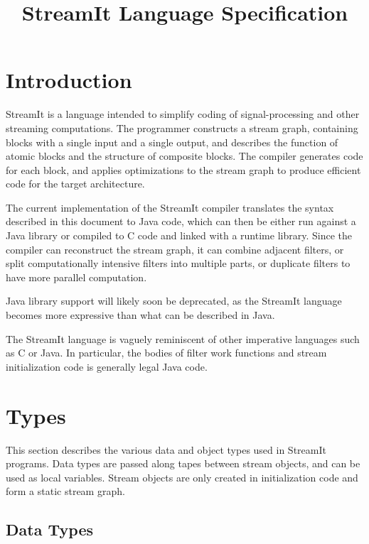 \documentclass[11pt]{article}
\title{StreamIt Language Specification}
\begin{document}
\maketitle
\tableofcontents

\section{Introduction}

StreamIt is a language intended to simplify coding of
signal-processing and other streaming computations.  The programmer
constructs a stream graph, containing blocks with a single input and a
single output, and describes the function of atomic blocks and the
structure of composite blocks.  The compiler generates code for each
block, and applies optimizations to the stream graph to produce
efficient code for the target architecture.

The current implementation of the StreamIt compiler translates the
syntax described in this document to Java code, which can then be
either run against a Java library or compiled to C code and linked
with a runtime library.  Since the compiler can reconstruct the stream
graph, it can combine adjacent filters, or split computationally
intensive filters into multiple parts, or duplicate filters to have
more parallel computation.

\begin{note}
Java library support will likely soon be deprecated, as the StreamIt
language becomes more expressive than what can be described in Java.
\end{note}

The StreamIt language is vaguely reminiscent of other imperative
languages such as C or Java.  In particular, the bodies of filter work
functions and stream initialization code is generally legal Java
code.

\section{Types}

This section describes the various data and object types used in
StreamIt programs.  Data types are passed along tapes between stream
objects, and can be used as local variables.  Stream objects are only
created in initialization code and form a static stream graph.

\subsection{Data Types}
\end{document}
